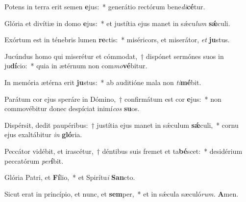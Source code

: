 \item Potens in terra erit semen \textbf{e}jus:~* generátio rectórum bene\hspace*{0.03em}\textit{di}\textbf{cé}tur.
\item Glória et divítiæ in domo \textbf{e}jus:~* et justítia ejus manet in sǽcu\hspace*{0.03em}\textit{lum} \textbf{sǽ}culi.
\item Exórtum est in ténebris lumen \textbf{re}ctis:~* miséricors, et miserátor, \textit{et} \textbf{ju}stus.
\item Jucúndus homo qui miserétur et cómmodat,~† dispónet sermónes suos in ju\textbf{dí}cio:~* quia in ætérnum non com\textit{mo}\textbf{vé}bitur.
\item In memória ætérna erit \textbf{ju}stus:~* ab auditióne mala non \textit{ti}\textbf{mé}bit.
\item Parátum cor ejus speráre in Dómino,~† confirmátum est cor \textbf{e}jus:~* non commovébitur donec despíciat inimí\hspace*{0.01em}\textit{cos} \textbf{su}os.
\item Dispérsit, dedit paupéribus:~† justítia ejus manet in sǽculum \textbf{sǽ}culi,~* cornu ejus exaltábitur \textit{in} \textbf{gló}ria.
\item Peccátor vidébit, et irascétur,~† déntibus suis fremet et ta\textbf{bé}scet:~* desidérium peccatórum \textit{per}\textbf{í}bit.
\item Glória Patri, et \textbf{Fí}lio,~* et Spirítu\textit{i} \textbf{San}cto.
\item Sicut erat in princípio, et nunc, et \textbf{sem}per,~* et in sǽcula sæculó\textit{rum.} \textbf{A}men.
